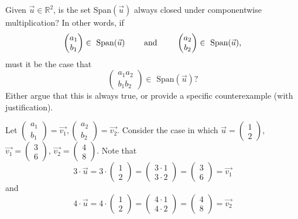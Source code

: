 \documentclass[12pt]{article}
\newenvironment{problem}[2][Problem]
{
	\begin{trivlist} 
		\item[\hskip \labelsep {\bfseries #1 #2:}]
	}
{
	\end{trivlist}
	}
\newenvironment{solution}[1][Solution]
{
	\begin{trivlist} 
		\item[\hskip \labelsep {\itshape #1:}]
	}
	{
	\end{trivlist}
}
\begin{document}
\newpage
\begin{problem}{2}
Given $\vec{u} \in \mathbb{R}^2$, is the set Span$(\vec{u})$ always closed under componentwise multiplication? In other words, if
\[
\begin{pmatrix} a_{1}\\b_{1} \end{pmatrix} \in \text{ Span}(\vec{u}) \hphantom{1000} \text{ and } \hphantom{1000} \begin{pmatrix} a_{2}\\b_{2} \end{pmatrix} \in \text{ Span}(\vec{u})\text{,}
\]
must it be the case that
\[
\begin{pmatrix} a_{1} a_{2}\\b_{1} b_{2} \end{pmatrix} \in \text{ Span}(\vec{u}) \text{?}
\]
Either argue that this is always true, or provide a specific counterexample (with justification).
\begin{solution}
Let  $\begin{pmatrix} a_{1}\\b_{1} \end{pmatrix}=\vec{v_{1}},\begin{pmatrix} a_{2}\\b_{2} \end{pmatrix}=\vec{v_{2}}$. Consider the case in which $\vec{u}=\begin{pmatrix} 1\\2 \end{pmatrix}$, $\vec{v_{1}}=\begin{pmatrix} 3\\6 \end{pmatrix}$, $\vec{v_{2}}=\begin{pmatrix} 4\\8 \end{pmatrix}$. Note that
\[
3 \cdot \vec{u} = 3 \cdot \begin{pmatrix} 1\\2 \end{pmatrix} = \begin{pmatrix} 3 \cdot 1\\ 3 \cdot 2 \end{pmatrix} = \begin{pmatrix} 3\\6 \end{pmatrix} = \vec{v_{1}}
\]
and
\[
4 \cdot \vec{u} = 4 \cdot \begin{pmatrix} 1\\2 \end{pmatrix} = \begin{pmatrix} 4 \cdot 1\\ 4 \cdot 2 \end{pmatrix} = \begin{pmatrix} 4\\8 \end{pmatrix} = \vec{v_{2}}
\]
\end{solution}
\end{problem}
\end{document}
